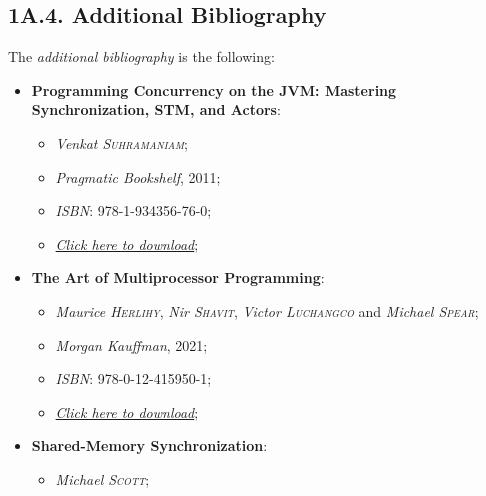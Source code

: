 \subsection*{\large{\textbf{1A.4. Additional Bibliography}}}
\label{ssec:lecture-1A4}

\noindent The \emph{additional bibliography} is the following:

\begin{itemize}
    \item \textbf{Programming Concurrency on the JVM: Mastering\\Synchronization, STM, and Actors}:
    \begin{itemize}
        \vspace{-0.2cm}
        \item \emph{Venkat \textsc{Suhramaniam}};
        \item \emph{Pragmatic Bookshelf}, 2011;
        \item \emph{ISBN}: 978-1-934356-76-0;
        \item \href{https://github.com/rubenandrebarreiro/fct-nova-concurrency-and-parallelism-labs/raw/main/books/additional-bibliography/programming-concurrency-on-the-jvm-mastering-synchronization-stm-and-actors-venkat-subramaniam.pdf}{\emph{Click here to download}};
    \end{itemize}
    \item \textbf{The Art of Multiprocessor Programming}:
    \begin{itemize}
        \vspace{-0.2cm}
        \item \emph{Maurice \textsc{Herlihy}}, \emph{Nir \textsc{Shavit}}, \emph{Victor \textsc{Luchangco}} and \emph{Michael \textsc{Spear}};
        \item \emph{Morgan Kauffman}, 2021;
        \item \emph{ISBN}: 978-0-12-415950-1;
        \item \href{https://github.com/rubenandrebarreiro/fct-nova-concurrency-and-parallelism-labs/raw/main/books/additional-bibliography/the-art-of-multiprocessor-programming-maurice-herlihy-nir-shavit-victor-luchangco-and-michael-spear.pdf}{\emph{Click here to download}};
    \end{itemize}
    \item \textbf{Shared-Memory Synchronization}:
    \begin{itemize}
        \vspace{-0.2cm}
        \item \emph{Michael \textsc{Scott}};

\end{itemize}
\end{itemize}
